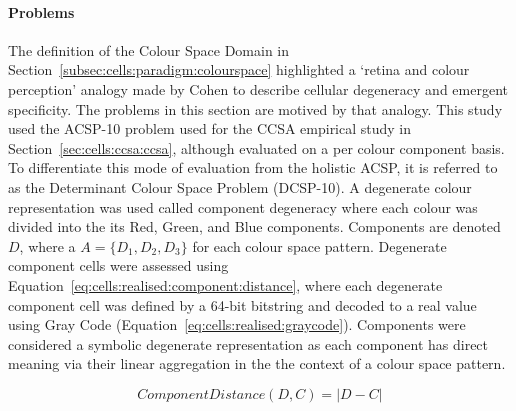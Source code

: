 \paragraph{Problems}
The definition of the Colour Space Domain in Section~\ref{subsec:cells:paradigm:colourspace} highlighted a `retina and colour perception' analogy made by Cohen to describe cellular degeneracy and emergent specificity. The problems in this section are motived by that analogy.
This study used the ACSP-10 problem used for the CCSA empirical study in Section~\ref{sec:cells:ccsa:ccsa}, although evaluated on a per colour component basis. To differentiate this mode of evaluation from the holistic ACSP, it is referred to as the Determinant Colour Space Problem (DCSP-10).
A degenerate colour representation was used called component degeneracy where each colour was divided into the its Red, Green, and Blue components. Components are denoted $D$, where a $A = \{D_1, D_2, D_3\}$ for each colour space pattern. Degenerate component cells were assessed using Equation~\ref{eq:cells:realised:component:distance}, where each degenerate component cell was defined by a 64-bit bitstring and decoded to a real value using Gray Code (Equation~\ref{eq:cells:realised:graycode}). Components were considered a symbolic degenerate representation as each component has direct meaning via their linear aggregation in the the context of a colour space pattern.

\begin{equation}
	ComponentDistance(D, C) = \left| D - C \right|
	\label{eq:cells:realised:component:distance}
\end{equation}

% 
%
